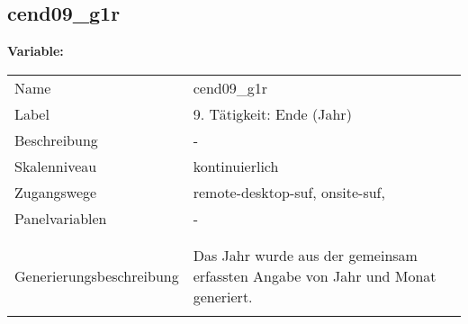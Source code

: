 	
	
	\subsection{cend09\_g1r}
	\label{subSection:cend09_g1r}

	\noindent\textbf{Variable:}\\
		\begin{tabular}{lL{11.3cm}}
			\label{tableVariable:cend09_g1r}
			Name & cend09\_g1r \\
			Label & 9. Tätigkeit: Ende (Jahr)  \\
			Beschreibung & - \\
			Skalenniveau & kontinuierlich \\
			Zugangswege &
				remote-desktop-suf,
				onsite-suf,
 \\
			Panelvariablen & -
			 \\
			 \\
 \\
					Generierungsbeschreibung & Das Jahr wurde aus der gemeinsam erfassten Angabe von Jahr und Monat generiert. 
				 \\	
			 \\
		\end{tabular}





